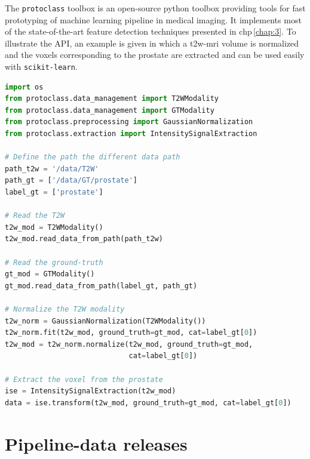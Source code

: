 The \texttt{protoclass} toolbox is an open-source python toolbox providing tools for fast prototyping of machine learning pipeline in medical imaging.
It implements most of the state-of-the-art feature detection techniques presented in \acs{chp}\,\ref{chap:3}.
To illustrate the API, an example is given in which a \ac{t2w}-\ac{mri} volume is normalized and the voxels corresponding to the prostate are extracted and can be used easily with \texttt{scikit-learn}.

\begin{lstlisting}[language=Python, caption=Code snippet to normalize a volume and extract some voxels.]
import os
from protoclass.data_management import T2WModality
from protoclass.data_management import GTModality
from protoclass.preprocessing import GaussianNormalization
from protoclass.extraction import IntensitySignalExtraction

# Define the path the different data path
path_t2w = '/data/T2W'
path_gt = ['/data/GT/prostate']
label_gt = ['prostate']

# Read the T2W
t2w_mod = T2WModality()
t2w_mod.read_data_from_path(path_t2w)

# Read the ground-truth
gt_mod = GTModality()
gt_mod.read_data_from_path(label_gt, path_gt)

# Normalize the T2W modality
t2w_norm = GaussianNormalization(T2WModality())
t2w_norm.fit(t2w_mod, ground_truth=gt_mod, cat=label_gt[0])
t2w_mod = t2w_norm.normalize(t2w_mod, ground_truth=gt_mod,
                             cat=label_gt[0])

# Extract the voxel from the prostate
ise = IntensitySignalExtraction(t2w_mod)
data = ise.transform(t2w_mod, ground_truth=gt_mod, cat=label_gt[0])
\end{lstlisting}

\section{Pipeline-data releases}

